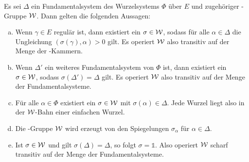 \begin{samepage}
\begin{thm}
  \label{thm:simplyTransitive}
  Es sei $\Delta$ ein Fundamentalsystem des Wurzelsystems $\Phi$ über $E$ und zugehöriger \weyl\hyp{}Gruppe $\mathcal{W}$.
  Dann gelten die folgenden Aussagen:
  \begin{enumerate}[(a)]

    \item Wenn $\gamma \in E$ regulär ist, dann existiert ein $\sigma \in \mathcal{W}$, sodass für alle $\alpha \in \Delta$ die Ungleichung $(\sigma(\gamma), \alpha) > 0$ gilt. 
      Es operiert $\mathcal{W}$ also transitiv auf der Menge der \weyl\hyp{}Kammern.

    \item Wenn $\Delta'$ ein weiteres Fundamentalsystem von $\Phi$ ist, dann existiert ein $\sigma \in \mathcal{W}$, sodass $\sigma(\Delta') = \Delta$ gilt.
      Es operiert $\mathcal{W}$ also transitiv auf der Menge der Fundamental\-systeme.

    \item Für alle $\alpha \in \Phi$ existiert ein $\sigma \in \mathcal{W}$ mit $\sigma(\alpha) \in \Delta$.
      Jede Wurzel liegt also in der $\mathcal{W}$\hyp{}Bahn einer einfachen Wurzel.

    \item Die \weyl\hyp{}Gruppe $\mathcal{W}$ wird erzeugt von den Spiegelungen $\sigma_\alpha$ für $\alpha \in \Delta$.

    \item Ist $\sigma \in \mathcal{W}$ und gilt $\sigma(\Delta) = \Delta$, so folgt $\sigma = \mathds{1}$.
      Also operiert $\mathcal{W}$ scharf transitiv auf der Menge der Fundamental\-systeme.
  \end{enumerate}
\end{thm}
\end{samepage}

